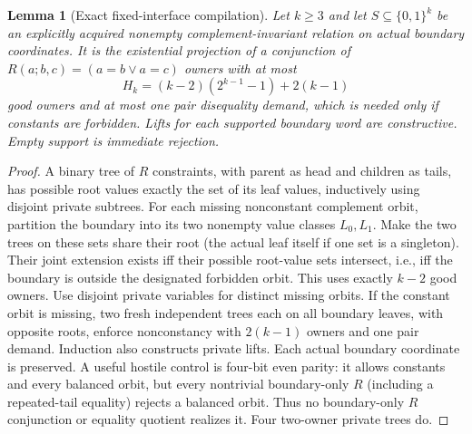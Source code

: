 \documentclass[11pt]{article}
\newtheorem{lemma}[theorem]{Lemma}
\begin{document}
\begin{lemma}[Exact fixed-interface compilation]\label{lem:do17-orbit}
Let $k\ge3$ and let $S\subseteq\{0,1\}^k$ be an explicitly acquired nonempty complement-invariant relation on actual boundary coordinates. It is the existential projection of a conjunction of $R(a;b,c)=(a=b\lor a=c)$ owners with at most
\[
H_k=(k-2)(2^{k-1}-1)+2(k-1)
\]
good owners and at most one pair disequality demand, which is needed only if constants are forbidden. Lifts for each supported boundary word are constructive. Empty support is immediate rejection.
\end{lemma}
\begin{proof}
A binary tree of $R$ constraints, with parent as head and children as tails, has possible root values exactly the set of its leaf values, inductively using disjoint private subtrees. For each missing nonconstant complement orbit, partition the boundary into its two nonempty value classes $L_0,L_1$. Make the two trees on these sets share their root (the actual leaf itself if one set is a singleton). Their joint extension exists iff their possible root-value sets intersect, i.e., iff the boundary is outside the designated forbidden orbit. This uses exactly $k-2$ good owners. Use disjoint private variables for distinct missing orbits. If the constant orbit is missing, two fresh independent trees each on all boundary leaves, with opposite roots, enforce nonconstancy with $2(k-1)$ owners and one pair demand. Induction also constructs private lifts. Each actual boundary coordinate is preserved. A useful hostile control is four-bit even parity: it allows constants and every balanced orbit, but every nontrivial boundary-only $R$ (including a repeated-tail equality) rejects a balanced orbit. Thus no boundary-only $R$ conjunction or equality quotient realizes it. Four two-owner private trees do.
\end{proof}
\end{document}
